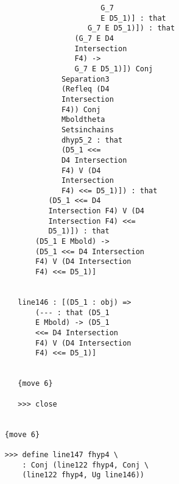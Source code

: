 \documentclass[12pt]{article}
\begin{document}
\begin{verbatim}
                                        G_7 
                                        E D5_1)] : that 
                                     G_7 E D5_1)]) : that 
                                  (G_7 E D4 
                                  Intersection 
                                  F4) -> 
                                  G_7 E D5_1)]) Conj 
                               Separation3 
                               (Refleq (D4 
                               Intersection 
                               F4)) Conj 
                               Mboldtheta 
                               Setsinchains 
                               dhyp5_2 : that 
                               (D5_1 <<= 
                               D4 Intersection 
                               F4) V (D4 
                               Intersection 
                               F4) <<= D5_1)]) : that 
                            (D5_1 <<= D4 
                            Intersection F4) V (D4 
                            Intersection F4) <<= 
                            D5_1)]) : that 
                         (D5_1 E Mbold) -> 
                         (D5_1 <<= D4 Intersection 
                         F4) V (D4 Intersection 
                         F4) <<= D5_1)]


                     line146 : [(D5_1 : obj) => 
                         (--- : that (D5_1 
                         E Mbold) -> (D5_1 
                         <<= D4 Intersection 
                         F4) V (D4 Intersection 
                         F4) <<= D5_1)]


                     {move 6}

                     >>> close


                  {move 6}

                  >>> define line147 fhyp4 \
                      : Conj (line122 fhyp4, Conj \
                      (line122 fhyp4, Ug line146))



\end{verbatim}
\end{document}

